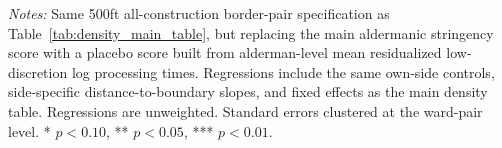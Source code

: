 \begin{table}[htbp]
    \caption{Low-Discretion Score as a Placebo for Density Outcomes}
    \label{tab:low_discretion_density_placebo}

    

    \footnotesize
    \textit{Notes:} Same 500ft all-construction border-pair specification as Table~\ref{tab:density_main_table}, but replacing the main aldermanic stringency score with a placebo score built from alderman-level mean residualized low-discretion log processing times.
    Regressions include the same own-side controls, side-specific distance-to-boundary slopes, and fixed effects as the main density table.
    Regressions are unweighted.
    Standard errors clustered at the ward-pair level. * $p<0.10$, ** $p<0.05$, *** $p<0.01$.
\end{table}
